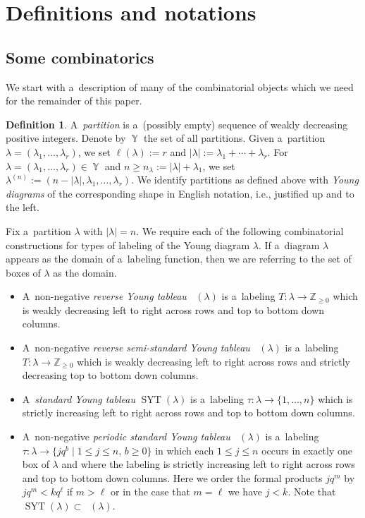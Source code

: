 \documentclass[pdftex]{sigma}
\numberwithin{equation}{section}
\theoremstyle{definition}
\newtheorem{Definition}[Theorem]{Definition}
\DeclareMathOperator{\Par}{\mathbb{Y}}
\DeclareMathOperator{\RYT}{\mathrm{RYT}_{\geq 0}}
\DeclareMathOperator{\SYT}{\mathrm{SYT}}
\DeclareMathOperator{\PSYT}{\mathrm{PSYT}_{\geq 0}}
\DeclareMathOperator{\RSSYT}{\mathrm{RSSYT}_{\geq 0}}
\begin{document}
\section{Definitions and notations}\label{defs and nots}

\subsection{Some combinatorics}

We start with a~description of many of the combinatorial objects which we need for the remainder of this paper.

\begin{Definition}\label{Tableaux defs}
 A~\textit{partition} is a~(possibly empty) sequence of weakly decreasing positive integers. Denote by $\Par$ the set of all partitions. Given a~partition $\lambda = (\lambda_1,\dots, \lambda_r)$, we set $\ell(\lambda) := r$ and $|\lambda| := \lambda_1 + \cdots + \lambda_r$. For $\lambda = (\lambda_1,\dots, \lambda_r) \in \Par$ and $n \geq n_{\lambda}:= |\lambda| + \lambda_1$, we set $\lambda^{(n)}:= (n -|\lambda|, \lambda_1,\dots, \lambda_r)$. We identify partitions as defined above with \textit{Young diagrams} of the corresponding shape in English notation, i.e., justified up and to the left.

 Fix a~partition $\lambda$ with $|\lambda| = n$. We require each of the following combinatorial constructions for types of labeling of the Young diagram $\lambda$. If a~diagram $\lambda$ appears as the domain of a~labeling function, then we are referring to the set of boxes of $\lambda$ as the domain.
\begin{itemize}\itemsep=0pt
 \item A~non-negative \textit{reverse Young tableau} $\RYT(\lambda)$ is a~labeling $T\colon \lambda \rightarrow \mathbb{Z}_{\geq 0}$ which is weakly decreasing left to right across rows and top to bottom down columns.
 \item A~non-negative \textit{reverse semi-standard Young tableau} $\RSSYT(\lambda)$ is a~labeling $T\colon \lambda \rightarrow \mathbb{Z}_{\geq 0}$ which is weakly decreasing left to right across rows and strictly decreasing top to bottom down columns.
 \item A~\textit{standard Young tableau} $\SYT(\lambda)$ is a~labeling $\tau\colon \lambda \rightarrow \{1,\dots,n\}$ which is strictly increasing left to right across rows and top to bottom down columns.
 \item A~non-negative \textit{periodic standard Young tableau} $\PSYT(\lambda)$ is a~labeling $\tau\colon \lambda \rightarrow \big\{ jq^{b}\mid 1\leq j \leq n,\, b \geq 0\big\}$ in which each $1\leq j \leq n$ occurs in exactly one box of $\lambda$ and where the labeling is strictly increasing left to right across rows and top to bottom down columns. Here we order the formal products $jq^m$ by $jq^m < kq^{\ell}$ if $m > \ell$ or in the case that $m = \ell$ we have $j < k$. Note that $\SYT(\lambda) \subset \PSYT(\lambda)$.
\end{itemize}


\end{Definition}
\end{document}
